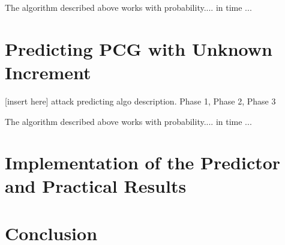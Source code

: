 \documentclass[preprint]{iacrtrans}
\begin{document}
\begin{theorem}
  The algorithm described above works with probability.... in time ...
\end{theorem}

\section{Predicting PCG with Unknown Increment}

[insert here] attack predicting algo description. Phase 1, Phase 2, Phase 3

\begin{theorem}
  The algorithm described above works with probability.... in time ...
\end{theorem}

\section{Implementation of the Predictor and Practical Results}

\section{Conclusion}




\end{document}
